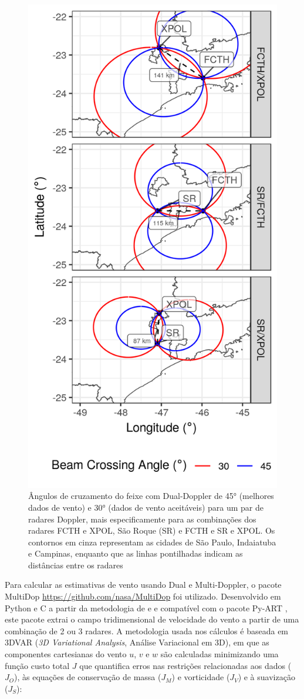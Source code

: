 \begin{figure}[hp]
	\begin{center}
		\caption{Ângulos de cruzamento do feixe com Dual-Doppler de \ang{45} (melhores dados de vento) e \ang{30} (dados de vento aceitáveis) para um par de radares Doppler, mais especificamente para as combinações dos radares FCTH e XPOL, São Roque (SR) e FCTH e SR e XPOL. Os contornos em cinza representam as cidades de São Paulo, Indaiatuba e Campinas, enquanto que as linhas pontilhadas indicam as distâncias entre os radares} 
		\label{doppler_lobes}
		\includegraphics[width=0.65\columnwidth]{../General_Processing/figures/dual_doppler_lobes.png}
	\end{center}
\end{figure}

Para calcular as estimativas de vento usando Dual e Multi-Doppler, o pacote MultiDop \url{https://github.com/nasa/MultiDop} foi utilizado. Desenvolvido em Python e C a partir da metodologia de  e  e compatível com o pacote Py-ART \cite{Helmus2016}, este pacote extrai o campo tridimensional de velocidade do vento a partir de uma combinação de 2 ou 3 radares. A metodologia usada nos cálculos é baseada em 3DVAR (\textit{3D Variational Analysis}, Análise Variacional em 3D), em que as componentes cartesianas do vento $u$, $v$ e $w$ são calculadas minimizando uma função custo total $J$ que quantifica erros nas restrições relacionadas aos dados ($J_O$), às equações de conservação de massa ($J_M$) e vorticidade ($J_V$) e à suavização ($J_S$):


